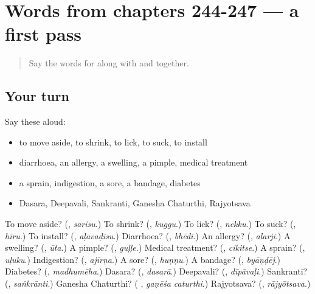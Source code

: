 \section[(dialogue)]{Words from chapters 244-247 — a first pass}

\label{lesson:KA-R252-first-pass-words-from-chapters-244-247}



\begin{quote}
Say the words for along with and together.
\end{quote}

\subsection*{Your turn}
Say these aloud:

\begin{itemize}
\raggedright
  \item to move aside, to shrink, to lick, to suck, to install
  \item diarrhoea, an allergy, a swelling, a pimple, medical treatment
  \item a sprain, indigestion, a sore, a bandage, diabetes
  \item Dasara, Deepavali, Sankranti, Ganesha Chaturthi, Rajyotsava
\end{itemize}

\begin{tcolorbox}[breakable,colback=teal!4,colframe=teal!35!black,title={Before you move on}]
To move aside? (\textbf{}, \emph{sarisu}.) To shrink? (\textbf{}, \emph{kuggu}.) To lick? (\textbf{}, \emph{nekku}.) To suck? (\textbf{}, \emph{hīru}.) To install? (\textbf{}, \emph{aḷavaḍisu}.) Diarrhoea? (\textbf{}, \emph{bhēdi}.) An allergy? (\textbf{}, \emph{alarji}.) A swelling? (\textbf{}, \emph{ūta}.) A pimple? (\textbf{}, \emph{guḷḷe}.) Medical treatment? (\textbf{}, \emph{cikitse}.) A sprain? (\textbf{}, \emph{uḷuku}.) Indigestion? (\textbf{}, \emph{ajīrṇa}.) A sore? (\textbf{}, \emph{huṇṇu}.) A bandage? (\textbf{}, \emph{byāṇḍēj}.) Diabetes? (\textbf{}, \emph{madhumēha}.) Dasara? (\textbf{}, \emph{dasarā}.) Deepavali? (\textbf{}, \emph{dīpāvaḷi}.) Sankranti? (\textbf{}, \emph{saṅkrānti}.) Ganesha Chaturthi? (\textbf{ }, \emph{gaṇēśa caturthi}.) Rajyotsava? (\textbf{}, \emph{rājyōtsava}.)
\end{tcolorbox}
